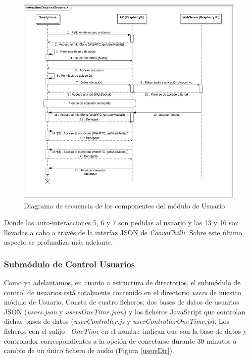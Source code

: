 \begin{figure}[!t]
\begin{center}
\includegraphics[width=0.75\linewidth]{./5_AnalisisOrganico/Img/diagramUML.png}
\end{center}
\caption{Diagrama de secuencia de los componentes del módulo de Usuario}
\label{diagramUML}
\end{figure}


Donde las auto-interacciones 5, 6 y 7 son pedidas al usuario y las 13 y 16 son llevadas a cabo a través de la interfaz JSON de \emph{CoovaChilli}. Sobre este último aspecto se profundiza más adelante.

\subsubsection{Submódulo de Control Usuarios} \label{userControl}

Como ya adelantamos, en cuanto a estructura de directorios, el submódulo de control de usuarios está totalmente contenido en el directorio \emph{users} de nuestro módulo de Usuario. Consta de cuatro ficheros: dos bases de datos de usuarios JSON (\emph{users.json} y \emph{usersOneTime.json}) y los ficheros JavaScript que controlan dichas bases de datos (\emph{userController.js} y \emph{userControllerOneTime.js}). Los ficheros con el sufijo \emph{--OneTime} en el nombre indican que son la base de datos y controlador correspondientes a la opción de conectarse durante 30 minutos a cambio de un único fichero de audio (Figura \ref{usersDir}).

